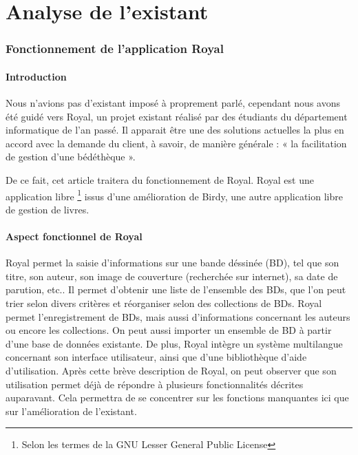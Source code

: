 \part{Analyse de l'existant}


\section{Fonctionnement de l'application Royal}


\subsection{Introduction}
Nous n'avions pas d'existant imposé à proprement parlé, cependant nous avons été guidé vers Royal, un projet existant réalisé par des étudiants du département informatique de l'an passé.
Il apparait être une des solutions actuelles la plus en accord avec la demande du client, à savoir, de manière générale : « la facilitation de gestion d'une bédéthèque ».

De ce fait, cet article traitera du fonctionnement de Royal.
Royal est une application 
libre \footnote{Selon les termes de la GNU Lesser General Public License}
issus d'une amélioration de Birdy, une autre application libre de gestion de livres.

\subsection{Aspect fonctionnel de Royal}
Royal permet la saisie d'informations sur une bande déssinée (BD), tel que son titre, son auteur, son image de couverture (recherchée sur internet), sa date de parution, etc..
Il permet d'obtenir une liste de l'ensemble des BDs, que l'on peut trier selon divers critères et réorganiser selon des collections de BDs.
Royal permet l'enregistrement de BDs, mais aussi d'informations concernant les auteurs ou encore les collections.
On peut aussi importer un ensemble de BD à partir d'une base de données existante.
De plus, Royal intègre un système multilangue concernant son interface utilisateur, ainsi que d'une bibliothèque d'aide d'utilisation.
Après cette brève description de Royal, on peut observer que son utilisation permet déjà de répondre à plusieurs fonctionnalités décrites auparavant. Cela permettra de se concentrer sur les fonctions manquantes ici que sur l'amélioration de l'existant.

